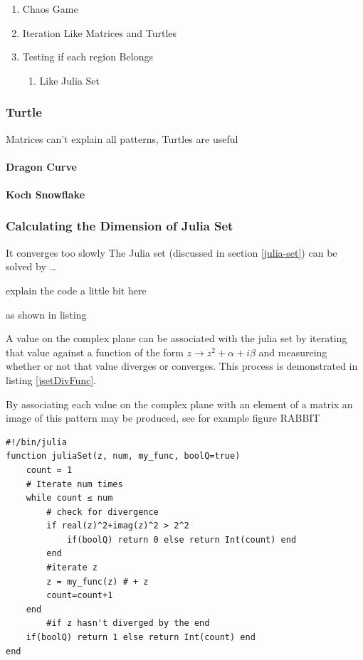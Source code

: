 \documentclass[11pt]{article}
\begin{document}
\begin{enumerate}
\item Chaos Game
\item Iteration Like Matrices and Turtles
\item Testing if each region Belongs
\begin{enumerate}
\item Like Julia Set
\end{enumerate}
\end{enumerate}

\subsubsection{Turtle}
\label{sec:org1a2f8ca}
Matrices can't explain all patterns, Turtles are useful
\paragraph{Dragon Curve}
\label{sec:orgfcf375b}
\paragraph{Koch Snowflake}
\label{sec:orga7f63d1}
\subsubsection{Calculating the Dimension of Julia Set}
\label{sec:orgdda2f23}
It converges too slowly
The Julia set (discussed in section \ref{julia-set}) can be solved by \ldots{}

explain the code a little bit here

as shown in listing

A value on the complex plane can be associated with the julia set by iterating
that value against a function of the form \(z \rightarrow z^{2} + \alpha + i
\beta\) and measureing whether or not that value diverges or converges. This process is demonstrated in listing \ref{jsetDivFunc}.

By associating each value on the complex plane with an element of a matrix an image of this pattern may be produced, see for example figure RABBIT

\begin{lstlisting}
#!/bin/julia
function juliaSet(z, num, my_func, boolQ=true)
    count = 1
    # Iterate num times
    while count ≤ num
        # check for divergence
        if real(z)^2+imag(z)^2 > 2^2
            if(boolQ) return 0 else return Int(count) end
        end
        #iterate z
        z = my_func(z) # + z
        count=count+1
    end
        #if z hasn't diverged by the end
    if(boolQ) return 1 else return Int(count) end
end
\end{lstlisting}
\end{document}
